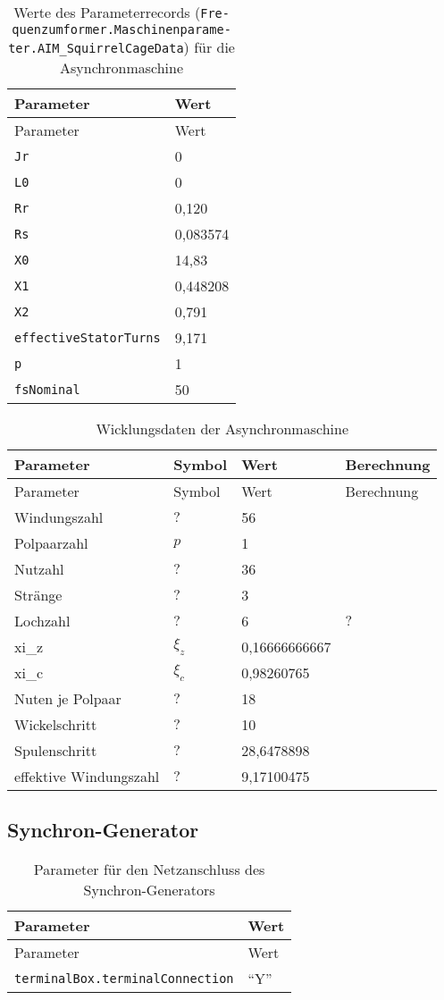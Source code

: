 \begin{longtable}[]{@{}ll@{}}
\caption{Werte des Parameterrecords
(\texttt{Fre­quenz­um­for­mer.­Ma­schi­nen­pa­ra­me­ter.­AIM\_­Squir­rel­Cage­Da­ta})
für die Asynchronmaschine}\tabularnewline
\toprule
Parameter & Wert\tabularnewline
\midrule
\endfirsthead
\toprule
Parameter & Wert\tabularnewline
\midrule
\endhead
\texttt{Jr} & 0\tabularnewline
\texttt{L0} & 0\tabularnewline
\texttt{Rr} & 0,120\tabularnewline
\texttt{Rs} & 0,083574\tabularnewline
\texttt{X0} & 14,83\tabularnewline
\texttt{X1} & 0,448208\tabularnewline
\texttt{X2} & 0,791\tabularnewline
\texttt{effectiveStatorTurns} & 9,171\tabularnewline
\texttt{p} & 1\tabularnewline
\texttt{fsNominal} & 50\tabularnewline
\bottomrule
\end{longtable}

\begin{longtable}[]{@{}llll@{}}
\caption{Wicklungsdaten der Asynchronmaschine}\tabularnewline
\toprule
Parameter & Symbol & Wert & Berechnung\tabularnewline
\midrule
\endfirsthead
\toprule
Parameter & Symbol & Wert & Berechnung\tabularnewline
\midrule
\endhead
Windungszahl & \(?\) & 56 &\tabularnewline
Polpaarzahl & \(p\) & 1 &\tabularnewline
Nutzahl & \(?\) & 36 &\tabularnewline
Stränge & \(?\) & 3 &\tabularnewline
Lochzahl & \(?\) & 6 & \(?\)\tabularnewline
xi\_z & \(\xi_z\) & 0,16666666667 &\tabularnewline
xi\_c & \(\xi_c\) & 0,98260765 &\tabularnewline
Nuten je Polpaar & \(?\) & 18 &\tabularnewline
Wickelschritt & \(?\) & 10 &\tabularnewline
Spulenschritt & \(?\) & 28,6478898 &\tabularnewline
effektive Windungszahl & \(?\) & 9,17100475 &\tabularnewline
\bottomrule
\end{longtable}

\hypertarget{synchron-generator}{%
\subsection{Synchron-Generator}\label{synchron-generator}}

\begin{longtable}[]{@{}ll@{}}
\caption{Parameter für den Netzanschluss des
Synchron-Generators}\tabularnewline
\toprule
Parameter & Wert\tabularnewline
\midrule
\endfirsthead
\toprule
Parameter & Wert\tabularnewline
\midrule
\endhead
\texttt{terminalBox.terminalConnection} & ``Y''\tabularnewline
\bottomrule
\end{longtable}

